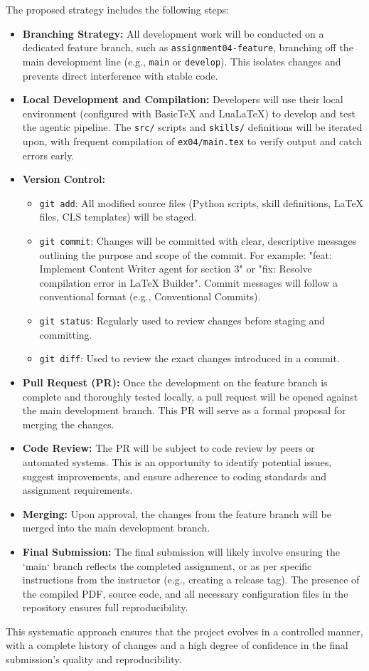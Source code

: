 \documentclass{custom-academic-template}
\begin{document}
The proposed strategy includes the following steps:
\begin{itemize}
    \item 	\textbf{Branching Strategy:} All development work will be conducted on a dedicated feature branch, such as 	\texttt{assignment04-feature}, branching off the main development line (e.g., 	\texttt{main} or 	\texttt{develop}). This isolates changes and prevents direct interference with stable code.
    \item 	\textbf{Local Development and Compilation:} Developers will use their local environment (configured with BasicTeX and LuaLaTeX) to develop and test the agentic pipeline. The 	\texttt{src/} scripts and 	\texttt{skills/} definitions will be iterated upon, with frequent compilation of 	\texttt{ex04/main.tex} to verify output and catch errors early.
    \item 	\textbf{Version Control:}
        \begin{itemize}
            \item 	\texttt{git add}: All modified source files (Python scripts, skill definitions, LaTeX files, CLS templates) will be staged.
            \item 	\texttt{git commit}: Changes will be committed with clear, descriptive messages outlining the purpose and scope of the commit. For example: "feat: Implement Content Writer agent for section 3" or "fix: Resolve compilation error in LaTeX Builder". Commit messages will follow a conventional format (e.g., Conventional Commits).
            \item 	\texttt{git status}: Regularly used to review changes before staging and committing.
            \item 	\texttt{git diff}: Used to review the exact changes introduced in a commit.
        \end{itemize}
    \item 	\textbf{Pull Request (PR):} Once the development on the feature branch is complete and thoroughly tested locally, a pull request will be opened against the main development branch. This PR will serve as a formal proposal for merging the changes.
    \item 	\textbf{Code Review:} The PR will be subject to code review by peers or automated systems. This is an opportunity to identify potential issues, suggest improvements, and ensure adherence to coding standards and assignment requirements.
    \item 	\textbf{Merging:} Upon approval, the changes from the feature branch will be merged into the main development branch.
    \item 	\textbf{Final Submission:} The final submission will likely involve ensuring the `main` branch reflects the completed assignment, or as per specific instructions from the instructor (e.g., creating a release tag). The presence of the compiled PDF, source code, and all necessary configuration files in the repository ensures full reproducibility.
\end{itemize}
This systematic approach ensures that the project evolves in a controlled manner, with a complete history of changes and a high degree of confidence in the final submission's quality and reproducibility.
\end{document}
